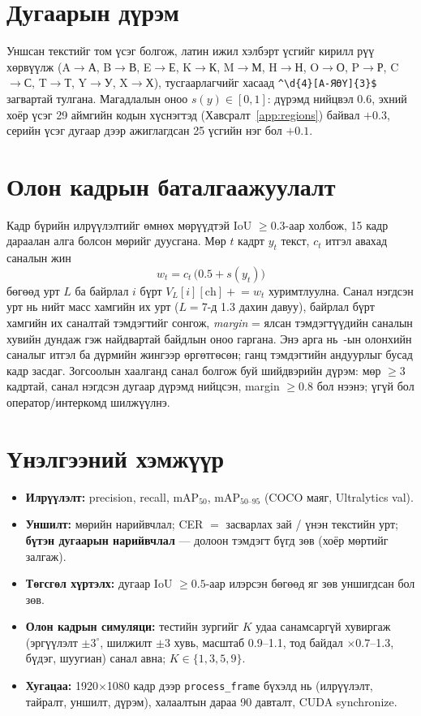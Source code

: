 \section{Дугаарын дүрэм}
Уншсан текстийг том үсэг болгож, латин ижил хэлбэрт үсгийг кирилл рүү хөрвүүлж (A$\to$А, B$\to$В, E$\to$Е, K$\to$К, M$\to$М, H$\to$Н, O$\to$О, P$\to$Р, C$\to$С, T$\to$Т, Y$\to$У, X$\to$Х), тусгаарлагчийг хасаад \texttt{\^{}\textbackslash d\{4\}[А-ЯӨҮ]\{3\}\$} загвартай тулгана. Магадлалын оноо $s(y)\in[0,1]$: дүрэмд нийцвэл 0.6, эхний хоёр үсэг 29 аймгийн кодын хүснэгтэд (Хавсралт~\ref{app:regions}) байвал $+0.3$, серийн үсэг дугаар дээр ажиглагдсан 25 үсгийн нэг бол $+0.1$.

\section{Олон кадрын баталгаажуулалт}
Кадр бүрийн илрүүлэлтийг өмнөх мөрүүдтэй IoU $\ge0.3$-аар холбож, 15 кадр дараалан алга болсон мөрийг дуусгана. Мөр $t$ кадрт $y_t$ текст, $c_t$ итгэл авахад саналын жин
\begin{equation}
w_t = c_t\,\bigl(0.5 + s(y_t)\bigr)
\end{equation}
бөгөөд урт $L$ ба байрлал $i$ бүрт $V_L[i][\mathrm{ch}] \mathrel{+}= w_t$ хуримтлуулна. Санал нэгдсэн урт нь нийт масс хамгийн их урт ($L=7$-д 1.3 дахин давуу), байрлал бүрт хамгийн их саналтай тэмдэгтийг сонгож, \emph{margin} = ялсан тэмдэгтүүдийн саналын хувийн дундаж гэж найдвартай байдлын оноо гаргана. Энэ арга нь~\cite{laroca2018}-ын олонхийн саналыг итгэл ба дүрмийн жингээр өргөтгөсөн; ганц тэмдэгтийн андуурлыг бусад кадр засдаг. Зогсоолын хаалганд санал болгож буй шийдвэрийн дүрэм: мөр $\ge3$ кадртай, санал нэгдсэн дугаар дүрэмд нийцсэн, margin $\ge0.8$ бол нээнэ; үгүй бол оператор/интеркомд шилжүүлнэ.

\section{Үнэлгээний хэмжүүр}
\begin{itemize}[leftmargin=2em]
\item \textbf{Илрүүлэлт:} precision, recall, mAP$_{50}$, mAP$_{50\text{--}95}$ (COCO маяг, Ultralytics val).
\item \textbf{Уншилт:} мөрийн нарийвчлал; CER $=$ засварлах зай / үнэн текстийн урт; \textbf{бүтэн дугаарын нарийвчлал} --- долоон тэмдэгт бүгд зөв (хоёр мөртийг залгаж).
\item \textbf{Төгсгөл хүртэлх:} дугаар IoU $\ge0.5$-аар илэрсэн бөгөөд яг зөв уншигдсан бол зөв.
\item \textbf{Олон кадрын симуляци:} тестийн зургийг $K$ удаа санамсаргүй хувиргаж (эргүүлэлт $\pm3^\circ$, шилжилт $\pm3$ хувь, масштаб 0.9--1.1, тод байдал $\times0.7$--1.3, бүдэг, шуугиан) санал авна; $K\in\{1,3,5,9\}$.
\item \textbf{Хугацаа:} 1920$\times$1080 кадр дээр \texttt{process\_frame} бүхэлд нь (илрүүлэлт, тайралт, уншилт, дүрэм), халаалтын дараа 90 давталт, CUDA synchronize.
\end{itemize}

